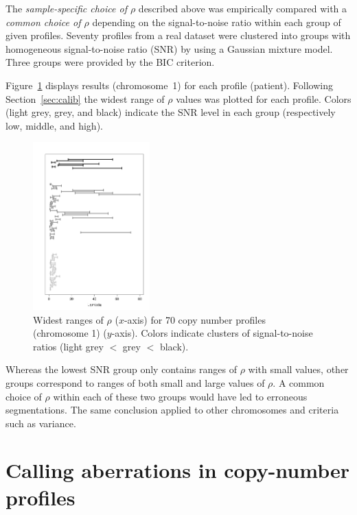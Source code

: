 \documentclass[a4paper,10pt]{article}
\begin{document}
          The \textit{sample-specific choice of $\rho$} described above was empirically compared with a \textit{common choice of  $\rho$} depending on the signal-to-noise ratio within each group of given profiles.
          Seventy profiles from a real dataset \cite{citerealdataset} were clustered into groups with homogeneous signal-to-noise ratio (SNR) by using a Gaussian mixture model. Three groups were provided by the BIC criterion. 

          Figure~\ref{fig:classifplateau} displays results (chromosome~1) for each profile (patient). Following Section~\ref{sec:calib} the widest range of $\rho$ values was plotted for each profile. 
          Colors (light grey, grey, and black) indicate the SNR level in each group (respectively low, middle, and high).
	
          \begin{figure}[!h]
	          \centering
	          \includegraphics[width=0.4\textwidth]{fig/classifplateau3}
            \caption{Widest ranges of $\rho$ ($x$-axis) for 70 copy number profiles (chromosome 1) ($y$-axis). Colors indicate clusters of signal-to-noise ratios (light grey $<$ grey $<$ black).}
            \label{fig:classifplateau}
          \end{figure}

          Whereas the lowest SNR group only contains ranges of $\rho$ with small values, other groups correspond to ranges of both small and large values of $\rho$. A common choice of $\rho$ within each of these two groups would have led to erroneous segmentations. The same conclusion applied to other chromosomes and criteria such as variance. 

	
\section{Calling aberrations in copy-number profiles}
	\label{sec:calling}
  
\end{document}
